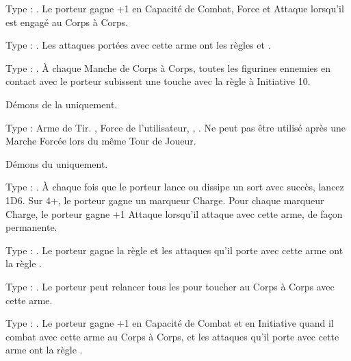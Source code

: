 \begin{multicols}{2}\raggedcolumns

\subtitle{Armes Démoniaques}\vspace{5pt}

\startpricelist

Type : \hw{}. Le porteur gagne +1 en Capacité de Combat, Force et Attaque lorsqu'il est engagé au Corps à Corps.

Type : \hw{}. Les attaques portées avec cette arme ont les règles  et .

Type : \hw{}. À chaque Manche de Corps à Corps, toutes les figurines ennemies en contact avec le porteur subissent une touche avec la règle \toxicattacks{} à Initiative 10.

Démons de la \textbf{\dlust} uniquement.

Type : Arme de Tir. , Force de l'utilisateur, , \quicktofire{}. Ne peut pas être utilisé après une Marche Forcée lors du même Tour de Joueur.

Démons du \textbf{\dchange} uniquement.

Type : \hw{}. À chaque fois que le porteur lance ou dissipe un sort avec succès, lancez 1D6. Sur 4+, le porteur gagne un marqueur Charge. Pour chaque marqueur Charge, le porteur gagne +1 Attaque lorsqu'il attaque avec cette arme, de façon permanente.

Type : \hw{}. Le porteur gagne la règle \fear{} et les attaques qu'il porte avec cette arme ont la règle \divineattacks{}.

Type : \hw{}. Le porteur peut relancer tous les  pour toucher au Corps à Corps avec cette arme.

\columnbreak\vspace*{-0.1cm}
Type : \hw{}. Le porteur gagne +1 en Capacité de Combat et en Initiative quand il combat avec cette arme au Corps à Corps, et les attaques qu'il porte avec cette arme ont la règle .

\endpricelist

\subtitle{Talismans démoniaques}\vspace{5pt}

\startpricelist


\end{multicols}
